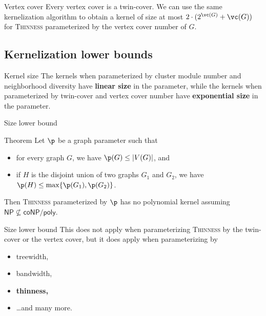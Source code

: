 \documentclass{beamer}
\DeclarePairedDelimiter\abs{\lvert}{\rvert}
\begin{document}
\begin{frame}{Vertex cover}
    Every vertex cover is a twin-cover.
    We can use the same kernelization algorithm to obtain a kernel of size at most $2 \cdot (2^{\vc(G)} + \vc(G))$ for \textsc{Thinness} parameterized by the vertex cover number of $G$.
\end{frame}

\subsection{Kernelization lower bounds}
\begin{frame}{Kernel size}
    The kernels when parameterized by cluster module number and neighborhood diversity have \textbf{linear size} in the parameter, while the kernels when parameterized by twin-cover and vertex cover number have \textbf{exponential size} in the parameter.


\end{frame}

\begin{frame}{Size lower bound}
    \begin{block}{Theorem}
        Let $\p$ be a graph parameter such that
        \begin{itemize}
            \item for every graph $G$, we have $\p(G) \leq \abs{V(G)}$, and
            \item if $H$ is the disjoint union of two graphs $G_1$ and $G_2$, we have $\p(H) \leq \max\{\p(G_1), \p(G_2)\}$.
        \end{itemize}
        Then \textsc{Thinness} parameterized by $\p$ has no polynomial kernel assuming $\textsf{NP} \not\subseteq \textsf{coNP} / \textsf{poly}$.
    \end{block}
\end{frame}

\begin{frame}{Size lower bound}
    This does not apply when parameterizing \textsc{Thinness} by the twin-cover or the vertex cover, but it does apply when parameterizing by
    \begin{itemize}
        \item treewidth,
        \item bandwidth,
        \item \textbf{thinness,}
        \item \dots and many more.
    \end{itemize}
\end{frame}
\end{document}
